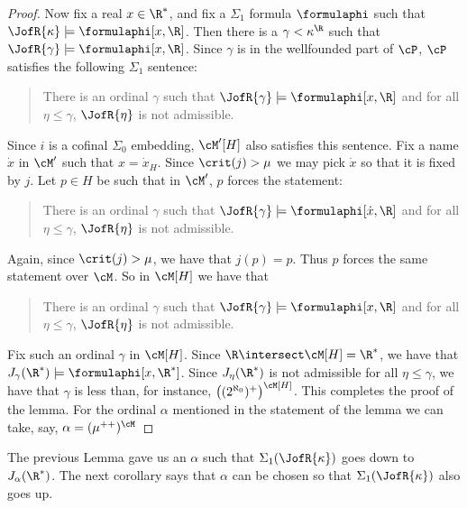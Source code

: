 \begin{proof}
Now fix a real $x\in\R^*$, and fix a $\Sigma_1$ formula $\formulaphi$
such that $\JofR{\kappa}\models\formulaphi[x,\R]$. Then there is
a $\gamma<\kappa^{\R}$ such that $\JofR{\gamma}\models\formulaphi[x,\R]$.
Since $\gamma$ is in the wellfounded part of $\cP$, $\cP$ satisfies the
following $\Sigma_1$ sentence:
\begin{quote}
There is an ordinal $\gamma$ such that
$\JofR{\gamma}\models\formulaphi[x,\R]$ and for all $\eta\leq\gamma$,
$\JofR{\eta}$ is not admissible.
\end{quote}
Since $i$ is a cofinal $\Sigma_0$ embedding, $\cM^{\prime}[H]$ also
satisfies this sentence. Fix a name $\dot{x}$ in $\cM^{\prime}$ such that
$x=\dot{x}_{H}$. Since $\crit(j)>\mu$ we may pick $\dot{x}$ so that it
is fixed by $j$. Let $p\in H$ be such that in $\cM^{\prime}$,
$p$ forces the statement:
\begin{quote}
There is an ordinal $\gamma$ such that
$\JofR{\gamma}\models\formulaphi[\dot{x},\R]$ and for all $\eta\leq\gamma$,
$\JofR{\eta}$ is not admissible.
\end{quote}
Again, since  $\crit(j)>\mu$, we have that $j(p)=p$. Thus $p$ forces the
same statement over $\cM$. So in $\cM[H]$ we have that
\begin{quote}
There is an ordinal $\gamma$ such that
$\JofR{\gamma}\models\formulaphi[x,\R]$ and for all $\eta\leq\gamma$,
$\JofR{\eta}$ is not admissible.
\end{quote}
Fix such an ordinal $\gamma$ in $\cM[H]$. Since $\R\intersect\cM[H]=\R^*$,
we have that $J_{\gamma}(\R^*)\models\formulaphi[x,\R^*]$. Since
$J_{\eta}(\R^*)$ is not admissible for all $\eta\leq\gamma$, we have that
$\gamma$ is less than, for instance,
$\bigl((2^{\aleph_0})^+\bigr)^{\cM[H]}$.
This completes the proof of the lemma. For the ordinal $\alpha$ mentioned
in the statement of the lemma we can take, say,
$\alpha=(\mu^{++})^{\cM}$
\end{proof}

The previous Lemma gave us an $\alpha$ such that
 $\Sigma_1(\JofR{\kappa})$ goes down to $J_{\alpha}(\R^*)$.
The next corollary says that $\alpha$ can be chosen so that
 $\Sigma_1(\JofR{\kappa})$ also goes up.

